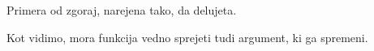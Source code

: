 \begin{examples}
  Primera od zgoraj, narejena tako, da delujeta.


  Kot vidimo, mora funkcija vedno sprejeti tudi argument, ki ga spremeni.


\end{examples}

